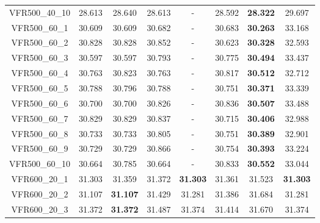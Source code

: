 \begin{tabular}{cc|ccc|ccc}
VFR500\_40\_10     & 28.613           & 28.640           & 28.613           & -                & 28.592           & {\bf 28.322}     & 29.697          \\ 
VFR500\_60\_1      & 30.609           & 30.609           & 30.682           & -                & 30.683           & {\bf 30.263}     & 33.168          \\ 
VFR500\_60\_2      & 30.828           & 30.828           & 30.852           & -                & 30.623           & {\bf 30.328}     & 32.593          \\ 
VFR500\_60\_3      & 30.597           & 30.597           & 30.793           & -                & 30.775           & {\bf 30.494}     & 33.437          \\ 
VFR500\_60\_4      & 30.763           & 30.823           & 30.763           & -                & 30.817           & {\bf 30.512}     & 32.712          \\ 
VFR500\_60\_5      & 30.788           & 30.796           & 30.788           & -                & 30.751           & {\bf 30.371}     & 33.339          \\ 
VFR500\_60\_6      & 30.700           & 30.700           & 30.826           & -                & 30.836           & {\bf 30.507}     & 33.488          \\ 
VFR500\_60\_7      & 30.829           & 30.829           & 30.837           & -                & 30.715           & {\bf 30.406}     & 32.988          \\ 
VFR500\_60\_8      & 30.733           & 30.733           & 30.805           & -                & 30.751           & {\bf 30.389}     & 32.901          \\ 
VFR500\_60\_9      & 30.729           & 30.729           & 30.866           & -                & 30.754           & {\bf 30.393}     & 33.224          \\ 
VFR500\_60\_10     & 30.664           & 30.785           & 30.664           & -                & 30.833           & {\bf 30.552}     & 33.044          \\ 
VFR600\_20\_1      & 31.303           & 31.359           & 31.372           & {\bf 31.303}     & 31.361           & 31.523           & {\bf 31.303}    \\ 
VFR600\_20\_2      & 31.107           & {\bf 31.107}     & 31.429           & 31.281           & 31.386           & 31.684           & 31.281          \\ 
VFR600\_20\_3      & 31.372           & {\bf 31.372}     & 31.487           & 31.374           & 31.414           & 31.670           & 31.374          \\ 

\end{tabular}

